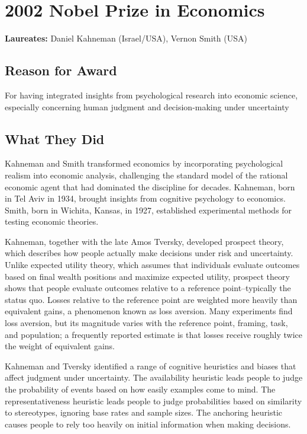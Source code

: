 \chapter{2002 Nobel Prize in Economics}
\textbf{Laureates: }Daniel Kahneman (Israel/USA), Vernon Smith (USA)

\section*{Reason for Award}
For having integrated insights from psychological research into economic science,
especially concerning human judgment and decision-making under uncertainty

\section{What They Did}
Kahneman and Smith transformed economics by incorporating psychological
realism into economic analysis, challenging the standard model of the rational
economic agent that had dominated the discipline for decades. Kahneman, born
in Tel Aviv in 1934, brought insights from cognitive psychology to economics.
Smith, born in Wichita, Kansas, in 1927, established experimental methods for
testing economic theories.

Kahneman, together with the late Amos Tversky, developed prospect theory,
which describes how people actually make decisions under risk and uncertainty.
Unlike expected utility theory, which assumes that individuals evaluate
outcomes based on final wealth positions and maximize expected utility,
prospect theory shows that people evaluate outcomes relative to a reference
point--typically the status quo. Losses relative to the reference point are
weighted more heavily than equivalent gains, a phenomenon known as loss
aversion. Many experiments find loss aversion, but its magnitude varies with the
reference point, framing, task, and population; a frequently reported estimate
is that losses receive roughly twice the weight of equivalent gains.

Kahneman and Tversky identified a range of cognitive heuristics and biases
that affect judgment under uncertainty. The availability heuristic leads
people to judge the probability of events based on how easily examples come
to mind. The representativeness heuristic leads people to judge probabilities
based on similarity to stereotypes, ignoring base rates and sample sizes. The
anchoring heuristic causes people to rely too heavily on initial information
when making decisions.

